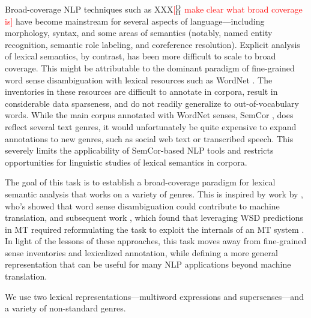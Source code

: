 \documentclass[11pt,letterpaper]{article}
\newcommand{\ensuretext}[1]{#1}
\newcommand{\nssmarker}{\ensuretext{\textcolor{magenta}{\ensuremath{^{\textsc{NS}}_{\textsc{S}}}}}}
\newcommand{\dhmarker}{\ensuretext{\textcolor{red}{\ensuremath{^{\textsc{D}}_{\textsc{H}}}}}}
\newcommand{\arkcomment}[3]{\ensuretext{\textcolor{#3}{[#1 #2]}}}
\newcommand{\nss}[1]{\arkcomment{\nssmarker}{#1}{magenta}}
\newcommand{\dirk}[1]{\arkcomment{\dhmarker}{#1}{red}}
\begin{document}
Broad-coverage NLP techniques such as XXX\dirk{make clear what broad coverage is} have
become mainstream for several aspects of language---including morphology, syntax, 
and some areas of semantics (notably, named entity recognition, %
semantic role labeling, %
and coreference resolution). %
Explicit analysis of lexical semantics, by contrast, has been more difficult to scale 
to broad coverage. %
This might be attributable to the dominant paradigm of fine-grained word sense disambiguation 
with lexical resources such as WordNet \citep{wordnet}.
The inventories in these resources 
are difficult to annotate in corpora, result in considerable data sparseness, 
and do not readily generalize to out-of-vocabulary words.
While the main corpus annotated with WordNet senses, 
SemCor \citep{semcor}, does reflect several text genres, it would unfortunately be quite expensive
to expand annotations to new genres, such as social web text 
or transcribed speech.
This severely limits the applicability of SemCor-based NLP tools 
and restricts opportunities for linguistic studies of lexical semantics in corpora.

The goal of this task is to establish a broad-coverage paradigm for lexical semantic analysis that works on a variety of genres.
This is inspired by work by \citet{carpuat-05,resnik-06}, who's showed that word sense disambiguation could contribute to machine translation, and subsequent work \citep{chan-07,carpuat-07,lefever-10}, which found that leveraging WSD predictions in MT required 
reformulating the task to exploit the internals of an MT system
. 
In light of the lessons of these approaches, this task moves away 
from fine-grained sense inventories and lexicalized annotation, 
while defining a more general representation that can be useful 
for many NLP applications beyond machine translation.

We use two lexical representations---multiword expressions 
and supersenses---and a variety of non-standard genres.

\end{document}
